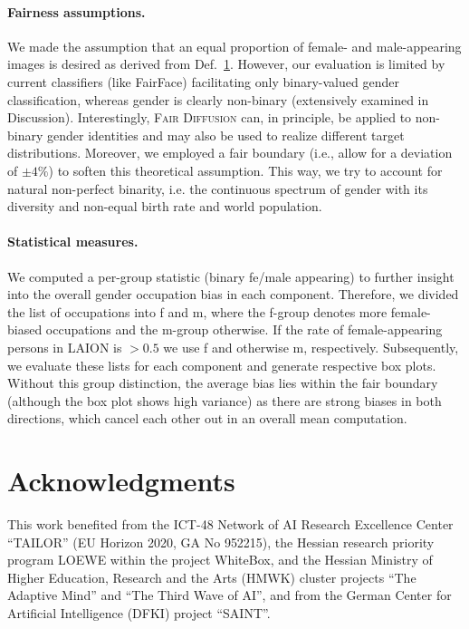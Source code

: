 \documentclass{article}%
\begin{document}
\paragraph{Fairness assumptions.} We made the assumption that an equal proportion of female- and male-appearing images is desired as derived from Def.~\hyperref[def:fair1]{1}. However, our evaluation is limited by current classifiers (like FairFace) facilitating only binary-valued gender classification, whereas gender is clearly non-binary (extensively examined in Discussion). Interestingly, \textsc{Fair Diffusion} can, in principle, be applied to non-binary gender identities and may also be used to realize different target distributions.
Moreover, we employed a fair boundary (i.e., allow for a deviation of $\pm4\%$) to soften this theoretical assumption. This way, we try to account for natural non-perfect binarity, i.e. the continuous spectrum of gender with its diversity and non-equal birth rate and world population.

\paragraph{Statistical measures.} We computed a per-group statistic (binary fe/male appearing) to further insight into the overall gender occupation bias in each component. Therefore, we divided the list of occupations into f and m, where the f-group denotes more female-biased occupations and the m-group otherwise. If the rate of female-appearing persons in LAION is $>\!0.5$ we use f and otherwise m, respectively. Subsequently, we evaluate these lists for each component and generate respective box plots. Without this group distinction, the average bias lies within the fair boundary (although the box plot shows high variance) as there are strong biases in both directions, which cancel each other out in an overall mean computation.

\section*{Acknowledgments}
This work benefited from the ICT-48 Network of AI Research Excellence Center ``TAILOR'' (EU Horizon 2020, GA No 952215), the Hessian research priority program LOEWE within the project WhiteBox, and the Hessian Ministry of Higher Education, Research and the Arts (HMWK) cluster projects ``The Adaptive Mind'' and ``The Third Wave of AI'', and from the German Center for Artificial Intelligence (DFKI) project ``SAINT''.

\clearpage




\appendix

\end{document}
